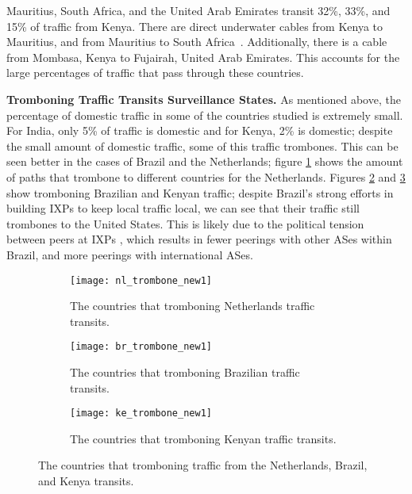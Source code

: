 Mauritius, South Africa, and the United Arab Emirates transit 32\%, 33\%, and 15\% of traffic from Kenya.  There are direct underwater cables from Kenya to Mauritius, and from Mauritius to South Africa~\cite{cablemap}.  Additionally, there is a cable from Mombasa, Kenya to Fujairah, United Arab Emirates.  This accounts for the large percentages of traffic that pass through these countries.

{\bf Tromboning Traffic Transits Surveillance States.}
As mentioned above, the percentage of domestic traffic in some of the countries studied is extremely small.  For India, only 5\% of traffic is domestic and for Kenya, 2\% is domestic; despite the small amount of domestic traffic, some of this traffic trombones.  This can be seen better in the cases of Brazil and the Netherlands; figure \ref{fig:trombone_netherlands} shows the amount of paths that trombone to different countries for the Netherlands.  Figures \ref{fig:trombone_brazil} and \ref{fig:trombone_kenya} show tromboning Brazilian and Kenyan traffic; despite Brazil's strong efforts in building IXPs to keep local traffic local, we can see that their traffic still trombones to the United States.  This is likely due to the political tension between peers at IXPs , which results in fewer peerings with other ASes within Brazil, and more peerings with international ASes. 


\begin{figure*}[t!]
\begin{minipage}{\linewidth}
\begin{subfigure}[b]{.32\linewidth}
\texttt{[image: nl\_trombone\_new1]}
\caption{The countries that tromboning Netherlands traffic transits.\label{fig:trombone_netherlands}}
\end{subfigure}\qquad
\begin{subfigure}[b]{.32\linewidth}
\texttt{[image: br\_trombone\_new1]}
\caption{The countries that tromboning Brazilian traffic transits.\label{fig:trombone_brazil}}
\end{subfigure}\qquad
\begin{subfigure}[b]{.32\linewidth}
\texttt{[image: ke\_trombone\_new1]}
\caption{The countries that tromboning Kenyan traffic transits.\label{fig:trombone_kenya}}
\end{subfigure}
\end{minipage}
\caption{The countries that tromboning traffic from the Netherlands, Brazil, and Kenya transits.}
\label{fig:trombone}
\end{figure*}

